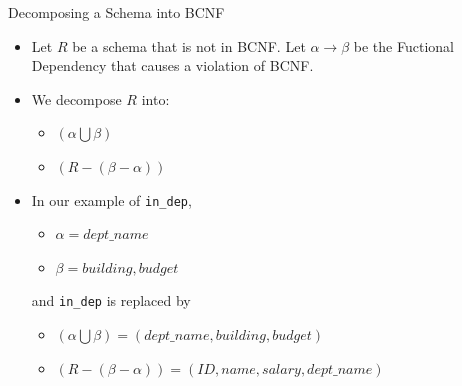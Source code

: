 \documentclass{beamer}
\begin{document}
\begin{frame}{Decomposing a Schema into BCNF}
    \begin{itemize}
        \item Let $R$ be a schema that is not in BCNF. Let $\alpha \rightarrow \beta$ be the Fuctional Dependency that causes a violation of BCNF.
        \item We decompose $R$ into:
            \begin{itemize}
                \item $(\alpha \bigcup \beta)$
                \item $(R - (\beta - \alpha))$
            \end{itemize}
        \item In our example of \texttt{in\_dep},
            \begin{itemize}
                \item $\alpha = dept\_name$
                \item $\beta = building, budget$
            \end{itemize}
        and \texttt{in\_dep} is replaced by
            \begin{itemize}
                \item $(\alpha \bigcup \beta) = (dept\_name, building, budget)$
                \item $(R - (\beta - \alpha)) = (ID, name, salary, dept\_name)$
            \end{itemize}
    \end{itemize}
\end{frame}
\end{document}
